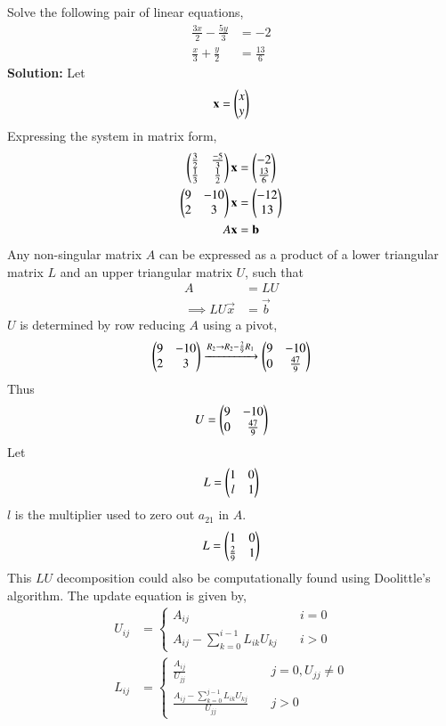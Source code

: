\documentclass[journal]{IEEEtran}
\begin{document}
Solve the following pair of linear equations,
\begin{align}
    \frac{3x}{2} - \frac{5y}{3} &= -2\\
    \frac{x}{3} + \frac{y}{2} &= \frac{13}{6}
\end{align}
\textbf{Solution:}
\newline
Let
\begin{align}
    \mathbf{x} = \begin{pmatrix}x\\y\end{pmatrix}
\end{align}
Expressing the system in matrix form,
\begin{align}
    \begin{pmatrix}\frac{3}{2} & \frac{-5}{3}\\ \frac{1}{3} & \frac{1}{2}\end{pmatrix}\mathbf{x} &= \begin{pmatrix}-2\\\frac{13}{6}\end{pmatrix} \\
    \begin{pmatrix}9 & -10 \\ 2 & 3\end{pmatrix}\mathbf{x} &= \begin{pmatrix}-12 \\ 13\end{pmatrix} \\
    A\mathbf{x} &= \mathbf{b}
\end{align}
Any non-singular matrix $A$ can be expressed as a product of a lower triangular matrix $L$ and an upper triangular matrix $U$, such that
\begin{align}
    A &= LU\\
    \implies LU\vec{x} &= \vec{b}
\end{align}
$U$ is determined by row reducing $A$ using a pivot,
\begin{align}
    \begin{pmatrix}9 & -10\\2 & 3\end{pmatrix} \xrightarrow{R_2 \to R_2 - \frac{2}{9}R_1} \begin{pmatrix}9 & -10\\0 & \frac{47}{9}\end{pmatrix}
\end{align}
Thus
\begin{align}
    U = \begin{pmatrix}9 & -10\\0 & \frac{47}{9}\end{pmatrix}
\end{align}
Let 
\begin{align}
    L = \begin{pmatrix}1 & 0\\l & 1\end{pmatrix}
\end{align}
$l$ is the multiplier used to zero out $a_{21}$ in $A$.
\begin{align}
    L = \begin{pmatrix}1 & 0\\ \frac{2}{9} & 1\end{pmatrix}
\end{align}
This $LU$ decomposition could also be computationally found using Doolittle's algorithm. The update equation is given by,
\begin{align}
    U_{ij} &= \begin{cases}
        A_{ij} & \quad i = 0\\
        A_{ij} - \sum_{k = 0}^{i - 1} L_{ik} U_{kj} & \quad i > 0
    \end{cases}\\
    L_{ij} &= \begin{cases}
        \frac{A_{ij}}{U_{jj}} & \quad j = 0, U_{jj} \neq 0\\
        \frac{A_{ij} - \sum_{k = 0}^{j - 1} L_{ik} U_{kj}}{U_{jj}} & \quad j > 0
    \end{cases}\\
\end{align}
\end{document}

